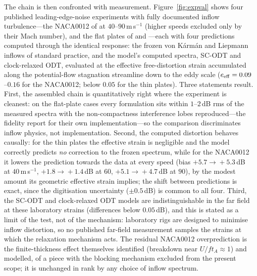 \documentclass[11pt,a4paper]{article}
\begin{document}
The chain is then confronted with measurement.
Figure~\ref{fig:expval} shows four published leading-edge-noise
experiments with fully documented inflow turbulence---the NACA0012 of
\citet{PatersonAmiet1976} at $40$--$90$\,m\,s$^{-1}$ (higher speeds
excluded only by their Mach number), and the flat plates of
\citet{Bampanis2022} and \citet{Narayanan2015}---each with four
predictions computed through the identical response: the frozen
von K\'arm\'an and Liepmann inflows of standard practice, and the
model's computed spectra, SC-ODT and clock-relaxed ODT, evaluated at the
effective free-distortion strain accumulated along the potential-flow
stagnation streamline down to the eddy scale ($e_{\rm eff}=0.09$--$0.16$
for the NACA0012; below $0.05$ for the thin plates). Three statements
result. First, the assembled chain is quantitatively right where the
experiment is cleanest: on the flat-plate cases every formulation sits
within $1$--$2$\,dB rms of the measured spectra with the
non-compactness interference lobes reproduced---the fidelity
\citet{Bampanis2022} report for their own implementation---so the
comparison discriminates inflow physics, not implementation. Second,
the computed distortion behaves causally: for the thin plates the
effective strain is negligible and the model correctly predicts
\emph{no} correction to the frozen spectrum, while for the NACA0012 it
lowers the prediction towards the data at every speed
(bias $+5.7\!\to\!+5.3$\,dB at $40$\,m\,s$^{-1}$,
$+1.8\!\to\!+1.4$\,dB at $60$, $+5.1\!\to\!+4.7$\,dB at $90$), by the
modest amount its geometric effective strain implies; the shift
between predictions is exact, since the digitisation uncertainty
($\pm0.5$\,dB) is common to all four. Third, the
SC-ODT and clock-relaxed ODT models are indistinguishable in the far
field at these laboratory strains (differences below $0.05$\,dB),
and this is stated as a limit of the test, not of the mechanism:
laboratory rigs are designed to minimise inflow distortion, so no
published far-field measurement samples the strains at which the
relaxation mechanism acts. The residual NACA0012 overprediction is
the finite-thickness effect \citet{PatersonAmiet1976} themselves
identified (breakdown near $U/f t_A\approx1$) and
\citet{Gershfeld2004} modelled, of a piece with the blocking mechanism
excluded from the present scope; it is unchanged in rank by any choice
of inflow spectrum.
\end{document}

